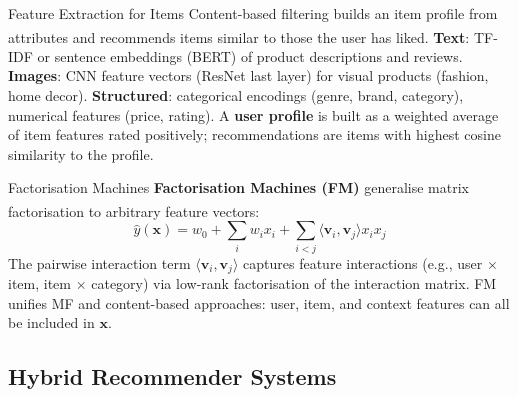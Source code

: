 \begin{v3topic}{Feature Extraction for Items}
    Content-based filtering builds an item profile from attributes and recommends items similar to those the user has liked\textsuperscript{\cite[][pp.~65--70]{aggarwalRecommenderSystems2016}}.
    \textbf{Text}: TF-IDF or sentence embeddings (BERT) of product descriptions and reviews.
    \textbf{Images}: CNN feature vectors (ResNet last layer) for visual products (fashion, home decor).
    \textbf{Structured}: categorical encodings (genre, brand, category), numerical features (price, rating).
    A \textbf{user profile} is built as a weighted average of item features rated positively; recommendations are items with highest cosine similarity to the profile.

\end{v3topic}
\begin{v3topic}{Factorisation Machines}
    \textbf{Factorisation Machines (FM)} generalise matrix factorisation to arbitrary feature vectors\textsuperscript{\cite[][p.~995]{rendleFactorizationMachines2010}}:
    \begin{equation}
        \hat{y}(\mathbf{x}) = w_0 + \sum_i w_i x_i + \sum_{i<j} \langle \mathbf{v}_i, \mathbf{v}_j \rangle x_i x_j
    \end{equation}
    The pairwise interaction term $\langle \mathbf{v}_i, \mathbf{v}_j \rangle$ captures feature interactions (e.g., user $\times$ item, item $\times$ category) via low-rank factorisation of the interaction matrix.
    FM unifies MF and content-based approaches: user, item, and context features can all be included in $\mathbf{x}$.

\end{v3topic}

\subsection{Hybrid Recommender Systems}


